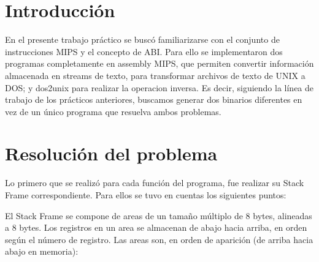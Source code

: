 \documentclass[a4paper,10pt]{article}
\begin{document}

\setcounter{page}{2}

\newpage
\thispagestyle{empty}
\tableofcontents

\newpage
\section{Introducci\'on}
   En el presente trabajo pr\'actico se busc\'o  familiarizarse con el conjunto de instrucciones MIPS y el concepto de ABI. Para ello se implementaron dos programas completamente en assembly MIPS, que permiten convertir informaci\'on almacenada en streams de texto, para transformar archivos de texto de UNIX a DOS; y dos2unix para realizar la operacion inversa. Es decir, siguiendo la l\'inea de trabajo de los pr\'acticos anteriores, buscamos generar dos binarios diferentes en vez de un \'unico programa que resuelva ambos problemas.

\section{Resoluci\'on del problema}
  Lo primero que se realiz\'o para cada funci\'on del programa, fue realizar su Stack Frame correspondiente.
  Para ellos se tuvo en cuentas los siguientes puntos:

  El Stack Frame se compone de areas de un tama\~no m\'ultiplo de 8 bytes, alineadas a 8 bytes.
  Los registros en un area se almacenan de abajo hacia arriba, en orden seg\'un el n\'umero de registro.
  Las areas son, en orden de aparici\'on (de arriba hacia abajo en memoria):
  
\end{document}
